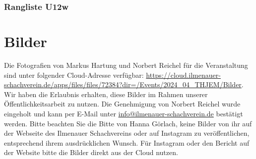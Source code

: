 \documentclass[a4paper,ngerman]{tui-algo-seminar}
\begin{document}
    \subsubsection{Rangliste U12w}
        
    
\clearpage


\section{Bilder}
Die Fotografien von Markus Hartung und Norbert Reichel für die Veranstaltung sind unter folgender Cloud-Adresse verfügbar: \url{https://cloud.ilmenauer-schachverein.de/apps/files/files/72384?dir=/Events/2024_04_THJEM/Bilder}. Wir haben die Erlaubnis erhalten, diese Bilder im Rahmen unserer Öffentlichkeitsarbeit zu nutzen. Die Genehmigung von Norbert Reichel wurde eingeholt und kann per E-Mail unter \href{mailto:info@ilmenauer-schachverein.de}{info@ilmenauer-schachverein.de} bestätigt werden.
Bitte beachten Sie die Bitte von Hanna Görlach, keine Bilder von ihr auf der Webseite des Ilmenauer Schachvereins oder auf Instagram zu veröffentlichen, entsprechend ihrem ausdrücklichen Wunsch. Für Instagram oder den Bericht auf der Website bitte die Bilder direkt aus der Cloud nutzen.

\end{document}
